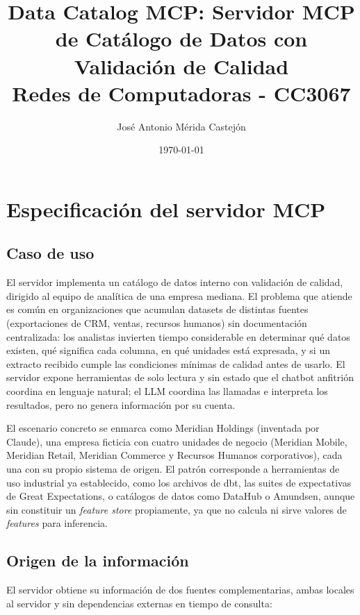 \documentclass[11pt]{article}
\title{\textbf{Data Catalog MCP: Servidor MCP de Catálogo de Datos con Validación de Calidad} \vspace{1em}\\
  Redes de Computadoras - CC3067}
\author{José Antonio Mérida Castejón}
\date{\today}
\newcommand{\code}[1]{\texttt{\seqsplit{#1}}}
\begin{document}
\maketitle

\section{Especificación del servidor MCP}

\subsection{Caso de uso}
El servidor implementa un catálogo de datos interno con validación de
calidad, dirigido al equipo de analítica de una empresa mediana. El
problema que atiende es común en organizaciones que acumulan datasets de
distintas fuentes (exportaciones de CRM, ventas, recursos humanos) sin
documentación centralizada: los analistas invierten tiempo considerable en
determinar qué datos existen, qué significa cada columna, en qué unidades
está expresada, y si un extracto recibido cumple las condiciones mínimas de
calidad antes de usarlo. El servidor expone herramientas de solo lectura y
sin estado que el chatbot anfitrión coordina en lenguaje natural; el LLM
coordina las llamadas e interpreta los resultados, pero no genera
información por su cuenta.

El escenario concreto se enmarca como Meridian Holdings (inventada por Claude), una empresa
ficticia con cuatro unidades de negocio (Meridian Mobile, Meridian Retail,
Meridian Commerce y Recursos Humanos corporativos), cada una con su propio
sistema de origen. El patrón corresponde a herramientas de uso industrial ya
establecido, como los archivos \code{schema.yml} de dbt, las suites de
expectativas de Great Expectations, o catálogos de datos como DataHub o
Amundsen, aunque sin constituir un \emph{feature store} propiamente, ya que
no calcula ni sirve valores de \emph{features} para inferencia.

\subsection{Origen de la información}
El servidor obtiene su información de dos fuentes complementarias, ambas
locales al servidor y sin dependencias externas en tiempo de consulta:
\end{document}
